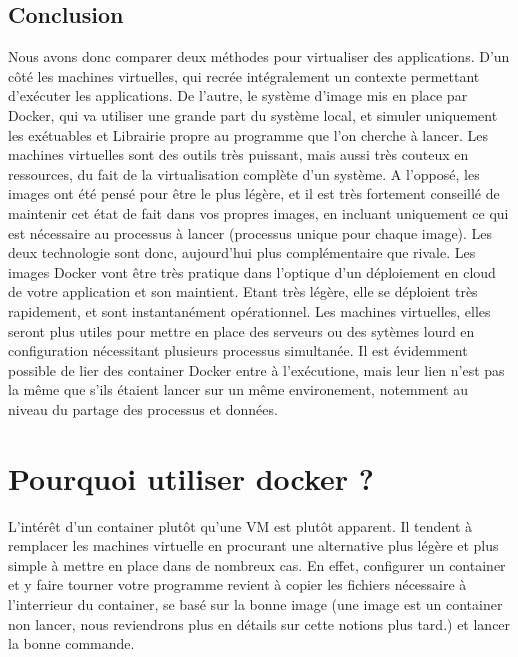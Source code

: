 \documentclass[a4paper,11pt]{article}
\begin{document}
\subsection*{Conclusion}
Nous avons donc comparer deux méthodes pour virtualiser des applications. D'un côté les machines virtuelles, qui recrée intégralement un contexte permettant d'exécuter les applications. De l'autre, le système d'image mis en place par Docker, qui va utiliser une grande part du système local, et simuler uniquement les exétuables et Librairie propre au programme que l'on cherche à lancer. Les machines virtuelles sont des outils très puissant, mais aussi très couteux en ressources, du fait de la virtualisation complète d'un système. A l'opposé, les images ont été pensé pour être le plus légère, et il est très fortement conseillé de maintenir cet état de fait dans vos propres images, en incluant uniquement ce qui est nécessaire au processus à lancer (processus unique pour chaque image). Les deux technologie sont donc, aujourd'hui plus complémentaire que rivale. Les images Docker vont être très pratique dans l'optique d'un déploiement en cloud de votre application et son maintient. Etant très légère, elle se déploient très rapidement, et sont instantanément opérationnel. Les machines virtuelles, elles seront plus utiles pour mettre en place des serveurs ou des sytèmes lourd en configuration nécessitant plusieurs processus simultanée. Il est évidemment possible de lier des container Docker entre à l'exécutione, mais leur lien n'est pas la même que s'ils étaient lancer sur un même environement, notemment au niveau du partage des processus et données.

\section{Pourquoi utiliser docker ?}
L'intérêt d'un container plutôt qu'une VM est plutôt apparent. Il tendent à remplacer les machines virtuelle en procurant une alternative plus légère et plus simple à mettre en place dans de nombreux cas. En effet, configurer un container et y faire tourner votre programme revient à copier les fichiers nécessaire à l'interrieur du container, se basé sur la bonne image (une image est un container non lancer, nous reviendrons plus en détails sur cette notions plus tard.) et lancer la bonne commande. 
\end{document}
